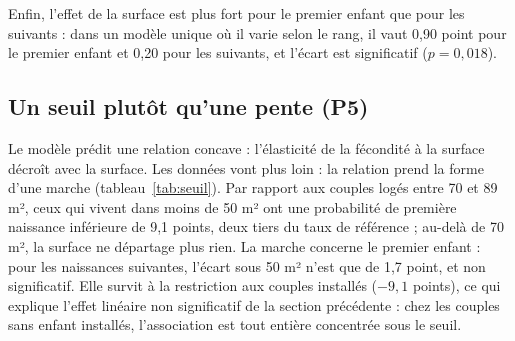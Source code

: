 \documentclass[11pt,a4paper]{article}
\theoremstyle{plain}
\theoremstyle{definition}
\theoremstyle{remark}
\begin{document}
Enfin, l'effet de la surface est plus fort pour le premier enfant que pour les suivants : dans un modèle unique où il varie selon le rang, il vaut 0,90 point pour le premier enfant et 0,20 pour les suivants, et l'écart est significatif ($p = 0{,}018$).

\subsection{Un seuil plutôt qu'une pente (P5)}\label{sec:seuil}

Le modèle prédit une relation concave : l'élasticité de la fécondité à la surface décroît avec la surface. Les données vont plus loin : la relation prend la forme d'une marche (tableau~\ref{tab:seuil}). Par rapport aux couples logés entre 70 et 89 m², ceux qui vivent dans moins de 50 m² ont une probabilité de première naissance inférieure de 9,1 points, deux tiers du taux de référence ; au-delà de 70 m², la surface ne départage plus rien. La marche concerne le premier enfant : pour les naissances suivantes, l'écart sous 50 m² n'est que de 1,7 point, et non significatif. Elle survit à la restriction aux couples installés ($-9{,}1$ points), ce qui explique l'effet linéaire non significatif de la section précédente : chez les couples sans enfant installés, l'association est tout entière concentrée sous le seuil.
\end{document}
